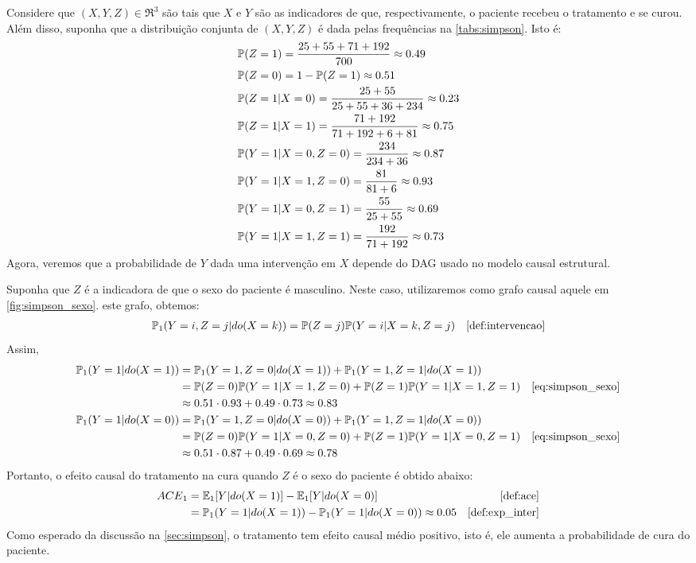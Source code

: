 \begin{example}
 \label{ex:simpson_fim}
 Considere que $(X,Y,Z) \in \Re^3$ são tais que
 $X$ e $Y$ são as indicadores de que, respectivamente, 
 o paciente recebeu o tratamento e se curou. 
 Além disso, suponha que a distribuição conjunta de $(X,Y,Z)$ é
 dada pelas frequências na \cref{tabs:simpson}. Isto é:
 \begin{align*}
  &\P(Z = 1) = \frac{25+55+71+192}{700} \approx 0.49 \\
  &\P(Z = 0) = 1 - \P(Z=1) \approx 0.51 \\
  &\P(Z = 1|X = 0) = \frac{25+55}{25+55+36+234} \approx 0.23 \\
  &\P(Z = 1|X = 1) = \frac{71+192}{71+192+6+81} \approx 0.75 \\
  &\P(Y = 1|X = 0, Z = 0) = \frac{234}{234+36} \approx 0.87 \\
  &\P(Y = 1|X = 1, Z = 0) = \frac{81}{81+6} \approx 0.93 \\
  &\P(Y = 1|X = 0, Z = 1) = \frac{55}{25+55} \approx 0.69 \\
  &\P(Y = 1|X = 1, Z = 1) = \frac{192}{71+192} \approx 0.73
 \end{align*}
 Agora, veremos que a probabilidade de $Y$ 
 dada uma intervenção em $X$ depende do DAG usado
 no modelo causal estrutural.
 
 Suponha que $Z$ é a indicadora de que 
 o sexo do paciente é masculino.
 Neste caso, utilizaremos como 
 grafo causal aquele em \cref{fig:simpson_sexo}.
 este grafo, obtemos:
 \begin{align}
  \label{eq:simpson_sexo}
  \P_1(Y=i,Z=j|do(X=k))
  &= \P(Z=j)\P(Y=i|X=k,Z=j) 
  & \text{\cref{def:intervencao}}
 \end{align}
 Assim,
 \begin{align*}
  \P_1(Y=1|do(X=1))
  &= \P_1(Y=1,Z=0|do(X=1)) + \P_1(Y=1,Z=1|do(X=1)) \\
  &= \P(Z=0)\P(Y=1|X=1,Z=0) + \P(Z=1)\P(Y=1|X=1,Z=1)
  & \text{\cref{eq:simpson_sexo}} \\
  &\approx 0.51 \cdot 0.93 + 0.49 \cdot 0.73 \approx 0.83 \\
  \P_1(Y=1|do(X=0))
  &= \P_1(Y=1,Z=0|do(X=0)) + \P_1(Y=1,Z=1|do(X=0)) \\
  &= \P(Z=0)\P(Y=1|X=0,Z=0) + \P(Z=1)\P(Y=1|X=0,Z=1)
  & \text{\cref{eq:simpson_sexo}} \\
  &\approx 0.51 \cdot 0.87 + 0.49 \cdot 0.69 \approx 0.78 \\
 \end{align*}
 Portanto, o efeito causal do tratamento na cura quando
 $Z$ é o sexo do paciente é obtido abaixo:
 \begin{align*}
  \ACE_1 &= \E_1[Y|do(X=1)] - \E_1[Y|do(X=0)] 
  & \text{\cref{def:ace}} \\
  &= \P_1(Y=1|do(X=1)) - \P_1(Y=1|do(X=0)) \approx 0.05
  & \text{\cref{def:exp_inter}}
 \end{align*}
 Como esperado da discussão na \cref{sec:simpson},
 o tratamento tem efeito causal médio positivo, isto é,
 ele aumenta a probabilidade de cura do paciente.
 

\end{example}
